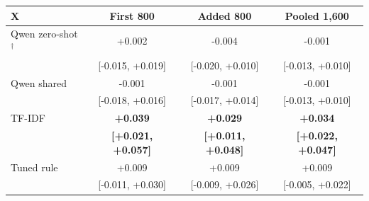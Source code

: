\begin{tabular}{@{}lccc@{}}
\toprule
X & First 800 & Added 800 & Pooled 1,600\\
\midrule
Qwen zero-shot$^\dagger$ & +0.002 & -0.004 & -0.001\\
 & [-0.015, +0.019] & [-0.020, +0.010] & [-0.013, +0.010]\\[2pt]
Qwen shared & -0.001 & -0.001 & -0.001\\
 & [-0.018, +0.016] & [-0.017, +0.014] & [-0.013, +0.010]\\[2pt]
TF-IDF & \textbf{+0.039} & \textbf{+0.029} & \textbf{+0.034}\\
 & \textbf{[+0.021, +0.057]} & \textbf{[+0.011, +0.048]} & \textbf{[+0.022, +0.047]}\\[2pt]
Tuned rule & +0.009 & +0.009 & +0.009\\
 & [-0.011, +0.030] & [-0.009, +0.026] & [-0.005, +0.022]\\[2pt]
\bottomrule
\end{tabular}
